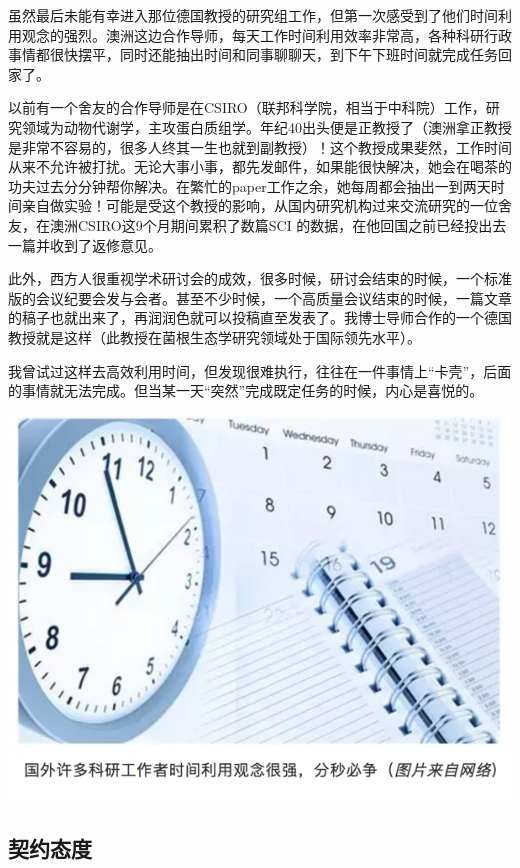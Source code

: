 \documentclass[]{book}
\begin{document}
虽然最后未能有幸进入那位德国教授的研究组工作，但第一次感受到了他们时间利用观念的强烈。澳洲这边合作导师，每天工作时间利用效率非常高，各种科研行政事情都很快摆平，同时还能抽出时间和同事聊聊天，到下午下班时间就完成任务回家了。

以前有一个舍友的合作导师是在CSIRO（联邦科学院，相当于中科院）工作，研究领域为动物代谢学，主攻蛋白质组学。年纪40出头便是正教授了（澳洲拿正教授是非常不容易的，很多人终其一生也就到副教授）！这个教授成果斐然，工作时间从来不允许被打扰。无论大事小事，都先发邮件，如果能很快解决，她会在喝茶的功夫过去分分钟帮你解决。在繁忙的paper工作之余，她每周都会抽出一到两天时间亲自做实验！可能是受这个教授的影响，从国内研究机构过来交流研究的一位舍友，在澳洲CSIRO这9个月期间累积了数篇SCI 的数据，在他回国之前已经投出去一篇并收到了返修意见。

此外，西方人很重视学术研讨会的成效，很多时候，研讨会结束的时候，一个标准版的会议纪要会发与会者。甚至不少时候，一个高质量会议结束的时候，一篇文章的稿子也就出来了，再润润色就可以投稿直至发表了。我博士导师合作的一个德国教授就是这样（此教授在菌根生态学研究领域处于国际领先水平）。

我曾试过这样去高效利用时间，但发现很难执行，往往在一件事情上``卡壳''，后面的事情就无法完成。但当某一天``突然''完成既定任务的时候，内心是喜悦的。

\includegraphics[width=8.33in]{images/osre4}

\hypertarget{ux5951ux7ea6ux6001ux5ea6}{%
\subsection{契约态度}\label{ux5951ux7ea6ux6001ux5ea6}}
\end{document}
